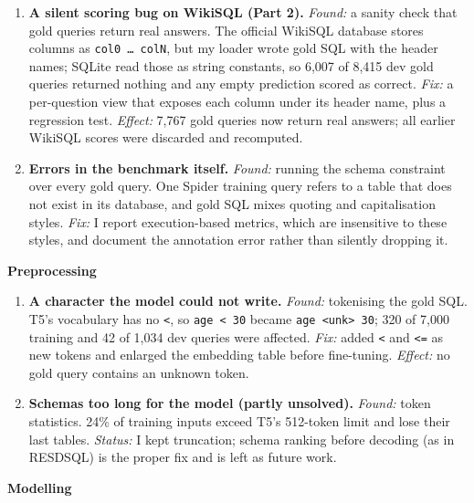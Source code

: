 \documentclass[
  10pt,
]{article}
\providecommand{\tightlist}{%
  \setlength{\itemsep}{0pt}\setlength{\parskip}{0pt}}
\begin{document}
\begin{enumerate}
\def\labelenumi{\arabic{enumi}.}
\tightlist
\item
  \textbf{A silent scoring bug on WikiSQL (Part 2).} \emph{Found:} a
  sanity check that gold queries return real answers. The official
  WikiSQL database stores columns as \texttt{col0\ …\ colN}, but my
  loader wrote gold SQL with the header names; SQLite read those as
  string constants, so 6,007 of 8,415 dev gold queries returned nothing
  and any empty prediction scored as correct. \emph{Fix:} a per-question
  view that exposes each column under its header name, plus a regression
  test. \emph{Effect:} 7,767 gold queries now return real answers; all
  earlier WikiSQL scores were discarded and recomputed.
\item
  \textbf{Errors in the benchmark itself.} \emph{Found:} running the
  schema constraint over every gold query. One Spider training query
  refers to a table that does not exist in its database, and gold SQL
  mixes quoting and capitalisation styles. \emph{Fix:} I report
  execution-based metrics, which are insensitive to these styles, and
  document the annotation error rather than silently dropping it.
\end{enumerate}

\textbf{Preprocessing}

\begin{enumerate}
\def\labelenumi{\arabic{enumi}.}
\setcounter{enumi}{2}
\tightlist
\item
  \textbf{A character the model could not write.} \emph{Found:}
  tokenising the gold SQL. T5's vocabulary has no \texttt{\textless{}},
  so \texttt{age\ \textless{}\ 30} became
  \texttt{age\ \textless{}unk\textgreater{}\ 30}; 320 of 7,000 training
  and 42 of 1,034 dev queries were affected. \emph{Fix:} added
  \texttt{\textless{}} and \texttt{\textless{}=} as new tokens and
  enlarged the embedding table before fine-tuning. \emph{Effect:} no
  gold query contains an unknown token.
\item
  \textbf{Schemas too long for the model (partly unsolved).}
  \emph{Found:} token statistics. 24\% of training inputs exceed T5's
  512-token limit and lose their last tables. \emph{Status:} I kept
  truncation; schema ranking before decoding (as in RESDSQL) is the
  proper fix and is left as future work.
\end{enumerate}

\textbf{Modelling}
\end{document}
